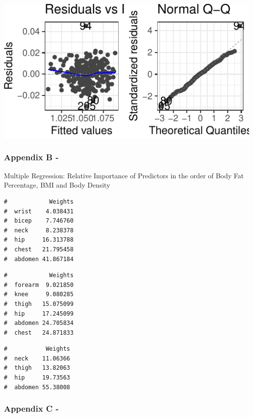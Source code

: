 \documentclass[a4paper,9pt,twocolumn,twoside,]{pinp}
\begin{document}
\begin{center}\includegraphics{Executive_Report_files/figure-latex/unnamed-chunk-5-3} \end{center}

\hypertarget{appendix-b--}{%
\subsubsection{Appendix B -}\label{appendix-b--}}

Multiple Regression: Relative Importance of Predictors in the order of
Body Fat Percentage, BMI and Body Density

\begin{ShadedResult}
\begin{verbatim}
#            Weights
#  wrist    4.038431
#  bicep    7.746760
#  neck     8.238378
#  hip     16.313788
#  chest   21.795458
#  abdomen 41.867184
\end{verbatim}
\end{ShadedResult}
\begin{ShadedResult}
\begin{verbatim}
#            Weights
#  forearm  9.021850
#  knee     9.080285
#  thigh   15.075099
#  hip     17.245099
#  abdomen 24.705834
#  chest   24.871833
\end{verbatim}
\end{ShadedResult}
\begin{ShadedResult}
\begin{verbatim}
#           Weights
#  neck    11.06366
#  thigh   13.82063
#  hip     19.73563
#  abdomen 55.38008
\end{verbatim}
\end{ShadedResult}

\hypertarget{appendix-c--}{%
\subsubsection{Appendix C -}\label{appendix-c--}}
\end{document}
